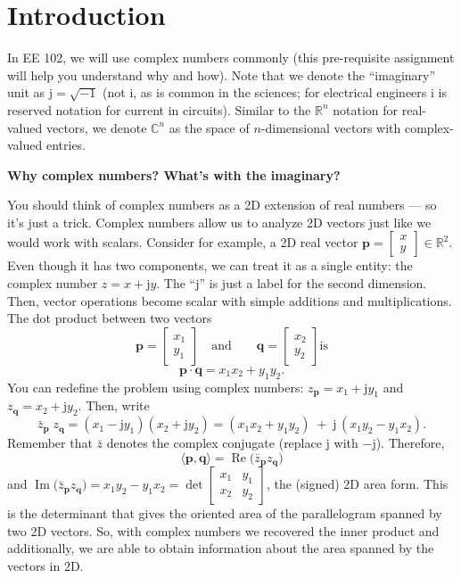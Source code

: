 \documentclass{ee102_pset}
\author{\rule{3cm}{0.4pt}} %
\begin{document}
\header
\section*{Introduction}
In EE 102, we will use complex numbers commonly (this pre-requisite assignment will help you understand why and how). Note that we denote the ``imaginary'' unit as $\mathrm{j}=\sqrt{-1}$ (not $\mathrm{i}$, as is common in the sciences; for electrical engineers $\mathrm{i}$ is reserved notation for current in circuits). Similar to the $\mathbb{R}^n$ notation for real-valued vectors, we denote $\mathbb{C}^n$ as the space of $n$-dimensional vectors with complex-valued entries.

\textbf{Why complex numbers? What's with the imaginary?}

You should think of complex numbers as a 2D extension of real numbers --- so it's just a trick. Complex numbers allow us to analyze 2D vectors just like we would work with scalars. Consider for example, a 2D real vector $\textbf{p} = \begin{bmatrix}x\\y\end{bmatrix}\in\mathbb{R}^2$. Even though it has two components, we can treat it as a single entity: the complex number $z = x+\mathrm{j}y$. The ``$\mathrm{j}$'' is just a label for the second dimension. Then, vector operations become scalar with simple additions and multiplications. The dot product between two vectors
\[
\mathbf{p}=\begin{bmatrix}x_1\\y_1\end{bmatrix}\quad \text{and} \qquad
\mathbf{q}=\begin{bmatrix}x_2\\y_2\end{bmatrix} \text{is}
\]
\[
\mathbf{p}\cdot \mathbf{q} = x_1x_2 + y_1y_2.
\]
You can redefine the problem using complex numbers: \(z_{\mathbf{p}}=x_1+\mathrm{j}y_1\) and \(z_{\mathbf{q}}=x_2+\mathrm{j}y_2\).
Then, write
\[
\bar{z}_{\mathbf{p}}\;z_{\mathbf{q}}
= (x_1-\mathrm{j}y_1)(x_2+\mathrm{j}y_2)
= (x_1x_2+y_1y_2)\;+\;\mathrm{j}\,(x_1y_2 - y_1x_2).
\]
Remember that $\bar{z}$ denotes the complex conjugate (replace \( \mathrm{j} \) with \( -\mathrm{j} \)). Therefore,
\[
\boxed{\;\langle \mathbf{p},\mathbf{q}\rangle = \operatorname{Re}\!\big(\bar{z}_{\mathbf{p}}z_{\mathbf{q}}\big)\;}
\]
and \(\operatorname{Im}\!\big(\bar{z}_{\mathbf{p}}z_{\mathbf{q}}\big)=x_1y_2 - y_1x_2
= \det\!\begin{bmatrix}x_1&y_1\\ x_2&y_2\end{bmatrix}\),
the (signed) 2D area form. This is the determinant that gives the oriented area of the parallelogram spanned by two 2D vectors. So, with complex numbers we recovered the inner product and additionally, we are able to obtain information about the area spanned by the vectors in 2D. 
\end{document}
